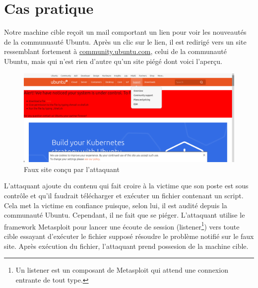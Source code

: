 		\section{Cas pratique}
		Notre machine cible reçoit un mail comportant un lien pour voir les nouveautés de la communuauté Ubuntu. Après un clic sur le lien, il est redirigé vers un site ressemblant fortement à \url{community.ubuntu.com}, celui de la communauté Ubuntu, mais qui n'est rien d'autre qu'un site piégé dont voici l'aperçu.
		 \begin{figure}[H]
					\begin{center}
					    \includegraphics[scale=0.5]{images/fakeubuntu.png}
					\end{center}
					\caption{Faux site conçu par l'attaquant}
					\label{Site web piegé}
				    \end{figure}
		L'attaquant ajoute du contenu qui fait croire à la victime que son poste est sous contrôle et qu'il faudrait télécharger et exécuter un fichier contenant un script. Cela met la victime en confiance puisque, selon lui, il est audité depuis la communauté Ubuntu. Cependant, il ne fait que se piéger. L'attaquant utilise le framework Metasploit \cite{E} pour lancer une écoute de session (listener\footnote{Un listener est un composant de Metasploit qui attend une connexion entrante de tout type.}) vers toute cible essayant d'exécuter le fichier supposé résoudre le problème  notifié sur le faux site. Après exécution du fichier, l'attaquant prend possesion  de la machine cible.
		
